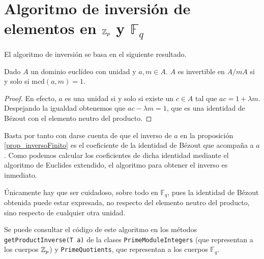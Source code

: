 \documentclass[a4paper, 11pt, twoside, notitlepage, openany, onecolumn, final]{report}
\begin{document}
	\section{Algoritmo de inversión de elementos en $\mathbb{Z}_p$ y $\mathbb{F}_q$}
	El algoritmo de inversión se basa en el siguiente resultado.
	\begin{prop}
		\label{prop_inversoFinito}
		Dado $A$ un dominio euclídeo con unidad y $a,m\in A$. $A$ es invertible en $A/mA$ si y solo si $\mathrm{mcd}(a,m)=1$.
	\end{prop}
	\begin{proof}
		En efecto, $a$ es una unidad si y solo si existe un $c\in A$ tal que $ac=1+\lambda m$. Despejando la igualdad obtenemos que $ac-\lambda m=1$, que es una identidad de Bézout con el elemento neutro del producto.
	\end{proof}
	Basta por tanto con darse cuenta de que el inverso de $a$ en la proposición \eqref{prop_inversoFinito} es el coeficiente de la identidad de Bézout que acompaña a $a$. Como podemos calcular los coeficientes de dicha identidad mediante el algoritmo de Euclides extendido, el algoritmo para obtener el inverso es inmediato.
	
	Únicamente hay que ser cuidadoso, sobre todo en $\mathbb{F}_q$, pues la identidad de Bézout obtenida puede estar expresada, no respecto del elemento neutro del producto, sino respecto de cualquier otra unidad.
	
	Se puede consultar el código de este algoritmo en los métodos \texttt{getProductInverse(T a)} de la clases \texttt{PrimeModuleIntegers} (que representan a los cuerpos $\mathbb{Z}_p$) y \texttt{PrimeQuotients}, que representan a los cuerpos $\mathbb{F}_q$.
\end{document}

